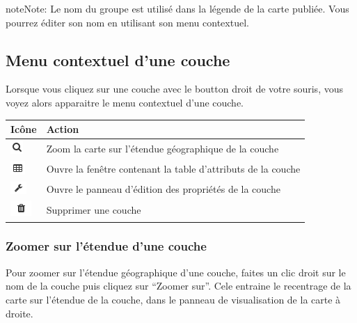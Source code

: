 \documentclass[letterpaper,10pt,french]{sphinxmanual}
\begin{document}
\begin{notice}{note}{Note:}
Le nom du groupe est utilisé dans la légende de la carte publiée. Vous pourrez éditer son nom en utilisant son menu contextuel.
\end{notice}


\subsection{Menu contextuel d'une couche}
\label{maps/layerstree:menu-contextuel-d-une-couche}
Lorsque vous cliquez sur une couche avec le boutton droit de votre
souris, vous voyez alors apparaitre le menu contextuel d'une couche.

\begin{tabulary}{\linewidth}{|L|L|}
\hline

\textbf{Icône}
 & 
\textbf{Action}
\\
\hline
\includegraphics{search.png}
 & 
Zoom la carte sur l'étendue géographique de la couche
\\
\hline
\includegraphics{table1.png}
 & 
Ouvre la fenêtre contenant la table d'attributs de la couche
\\
\hline
\includegraphics{configuration1.png}
 & 
Ouvre le panneau d'édition des propriétés de la couche
\\
\hline
\includegraphics{delete3.png}
 & 
Supprimer une couche
\\
\hline\end{tabulary}



\subsubsection{Zoomer sur l'étendue d'une couche}
\label{maps/layerstree:zoomer-sur-l-etendue-d-une-couche}
Pour zoomer sur l'étendue géographique d'une couche, faites un clic
droit sur le nom de la couche puis cliquez sur ``Zoomer sur''. Cele
entraine le recentrage de la carte sur l'étendue de la couche, dans le
panneau de visualisation de la carte à droite.
\end{document}
